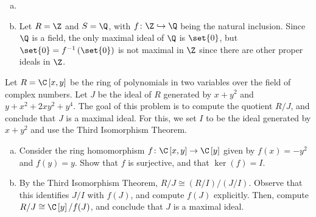 \documentclass[10pt]{mypackage}
\begin{document}
\begin{solution}\hfill
  \begin{enumerate}[(a)]
    \item 
    \item Let $R = \Z$ and $S = \Q$, with $f\colon \Z\hookrightarrow \Q$ being the natural inclusion. Since $\Q$ is a field, the only maximal ideal of $\Q$ is $\set{0}$, but $\set{0} = f^{-1}\left( \set{0} \right)$ is not maximal in $\Z$ since there are other proper ideals in $\Z$.
  \end{enumerate}
\end{solution}
\begin{problem}[Problem 6]
  Let $R = \C\left[ x,y \right]$ be the ring of polynomials in two variables over the field of complex numbers. Let $J$ be the ideal of $R$ generated by $x +y^2$ and $y + x^2 + 2xy^2 + y^{4}$. The goal of this problem is to compute the quotient $R/J$, and conclude that $J$ is a maximal ideal. For this, we set $I$ to be the ideal generated by $x + y^2$ and use the Third Isomorphism Theorem.
  \begin{enumerate}[(a)]
    \item Consider the ring homomorphism $f\colon \C\left[ x,y \right]\rightarrow \C\left[ y \right]$ given by $f(x) = -y^2$ and $f(y) = y$. Show that $f$ is surjective, and that $\ker(f) = I$.
    \item By the Third Isomorphism Theorem, $R/J\cong (R/I)/(J/I)$. Observe that this identifies $J/I$ with $f(J)$, and compute $f(J)$ explicitly. Then, compute $R/J \cong \C\left[ y \right]/f(J)$, and conclude that $J$ is a maximal ideal.
  \end{enumerate}
\end{problem}
\end{document}
